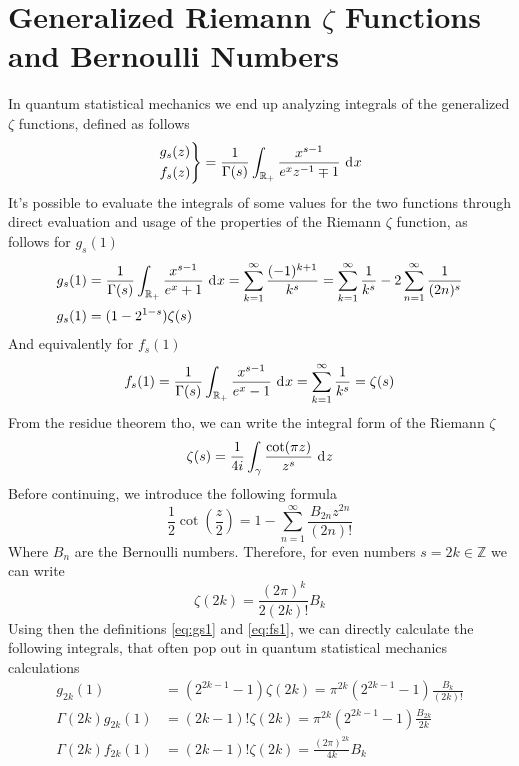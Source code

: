 \documentclass[../qm.tex]{subfiles}
\begin{document}
	\section{Generalized Riemann $\zeta$ Functions and Bernoulli Numbers}\label{app:zeta}
	In quantum statistical mechanics we end up analyzing integrals of the generalized $\zeta$ functions, defined as follows
	\begin{equation}
		\left.\begin{aligned}
			&g_s(z)\\
			&f_s(z)
		\end{aligned}\right\}=\frac{1}{\Gamma(s)}\int_{\mathbb{R}_+}\frac{x^{s-1}}{e^{x}z^{-1}\mp1}\ \mathrm{d}^{}x
		\label{eq:generalizedzetafunctions}
	\end{equation}
	It's possible to evaluate the integrals of some values for the two functions through direct evaluation and usage of the properties of the Riemann $\zeta$ function, as follows for $g_s(1)$
	\begin{equation}
		\begin{aligned}
			g_s(1)&=\frac{1}{\Gamma(s)}\int_{\mathbb{R}_+}\frac{x^{s-1}}{e^{x}+1}\ \mathrm{d}^{}x=\sum_{k=1}^{\infty}\frac{(-1)^{k+1}}{k^s}=\sum_{k=1}^{\infty}\frac{1}{k^s}-2\sum_{n=1}^{\infty}\frac{1}{(2n)^s}\\
			g_s(1)&=(1-2^{1-s})\zeta(s)
		\end{aligned}
		\label{eq:gs1}
	\end{equation}
	And equivalently for $f_s(1)$
	\begin{equation}
		f_s(1)=\frac{1}{\Gamma(s)}\int_{\mathbb{R}_+}\frac{x^{s-1}}{e^{x}-1}\ \mathrm{d}^{}x=\sum_{k=1}^{\infty}\frac{1}{k^s}=\zeta(s)
		\label{eq:fs1}
	\end{equation}
	From the residue theorem tho, we can write the integral form of the Riemann $\zeta$
	\begin{equation}
		\zeta(s)=\frac{1}{4i}\int_{\gamma}\frac{\cot(\pi z)}{z^s}\ \mathrm{d}^{}z
		\label{eq:intzetariemann}
	\end{equation}
	Before continuing, we introduce the following formula
	\begin{equation}
		\frac{1}{2}\cot\left( \frac{z}{2} \right)=1-\sum_{n=1}^{\infty}\frac{B_{2n}z^{2n}}{(2n)!}
		\label{eq:bernoullinumbers}
	\end{equation}
	Where $B_n$ are the Bernoulli numbers. Therefore, for even numbers $s=2k\in\mathbb{Z}$ we can write
	\begin{equation}
		\zeta(2k)=\frac{(2\pi)^k}{2(2k)!}B_k
		\label{eq:zeta2k}
	\end{equation}
	Using then the definitions \eqref{eq:gs1} and \eqref{eq:fs1}, we can directly calculate the following integrals, that often pop out in quantum statistical mechanics calculations
	\begin{equation}
		\begin{aligned}
			g_{2k}(1)&=(2^{2k-1}-1)\zeta(2k)=\pi^{2k}(2^{2k-1}-1)\frac{B_k}{(2k)!}\\
			\Gamma(2k)g_{2k}(1)&=(2k-1)!\zeta(2k)=\pi^{2k}(2^{2k-1}-1)\frac{B_{2k}}{2k}\\
			\Gamma(2k)f_{2k}(1)&=(2k-1)!\zeta(2k)=\frac{(2\pi)^{2k}}{4k}B_k
		\end{aligned}
		\label{eq:evengsfs}
	\end{equation}
\end{document}

